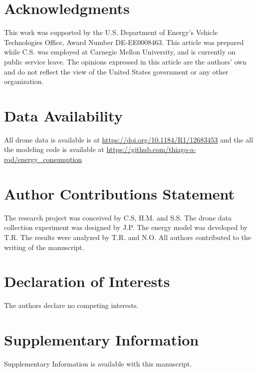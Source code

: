 \documentclass{article}
\begin{document}
\section*{Acknowledgments}
This work was supported by the U.S. Department of Energy's Vehicle Technologies Office, Award Number DE-EE0008463. This article was prepared while C.S. was employed at Carnegie Mellon University, and is currently on public service leave. The opinions expressed in this article are the authors’ own and do not reflect the view of the United States government or any other organization.

\section*{Data Availability}
All drone data is available is at \href{https://doi.org/10.1184/R1/12683453}{https://doi.org/10.1184/R1/12683453} and the all the modeling code is available at \href{https://github.com/thiago-a-rod/energy\_consumption}{https://github.com/thiago-a-rod/energy\_consumption} 

\section*{Author Contributions Statement}
The research project was conceived by C.S, H.M. and S.S. The drone data collection experiment was designed by J.P. The energy model was developed by T.R. The results were analyzed by T.R. and N.O. All authors contributed to the writing of the manuscript. 

\section*{Declaration of Interests}
The authors declare no competing interests.

\section*{Supplementary Information}
Supplementary Information is available with this manuscript.

%
%
\printbibliography
\end{document}
